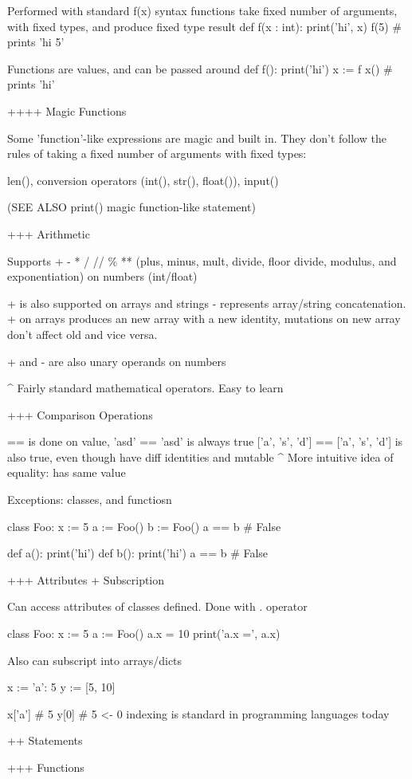 Performed with standard f(x) syntax
functions take fixed number of arguments, with fixed types, and produce fixed type result
def f(x : int): print('hi', x)
f(5) # prints 'hi 5'

Functions are values, and can be passed around
def f(): print('hi')
x := f
x() # prints 'hi'

++++ Magic Functions

Some 'function'-like expressions are magic and built in. They don't follow
the rules of taking a fixed number of arguments with fixed types:

len(), conversion operators (int(), str(), float()), input()

(SEE ALSO print() magic function-like statement)

+++ Arithmetic

Supports + - * / // \% ** (plus, minus, mult, divide, floor divide, modulus, and exponentiation)
on numbers (int/float)

+ is also supported on arrays and strings - represents array/string concatenation.
+ on arrays produces an new array with a new identity, mutations on new array don't affect old and vice versa.

+ and - are also unary operands on numbers

^ Fairly standard mathematical operators. Easy to learn

+++ Comparison Operations

== is done on value, 'asd' == 'asd' is always true
['a', 's', 'd'] == ['a', 's', 'd'] is also true, even though have diff identities and mutable
^ More intuitive idea of equality: has same value

Exceptions: classes, and functiosn

class Foo:
    x := 5
a := Foo()
b := Foo()
a == b # False

def a(): print('hi')
def b(): print('hi')
a == b # False

+++ Attributes + Subscription

Can access attributes of classes defined. Done with . operator

class Foo:
    x := 5
a := Foo()
a.x = 10
print('a.x =', a.x)

Also can subscript into arrays/dicts

x := {'a': 5}
y := [5, 10]

x['a'] # 5
y[0] # 5 <- 0 indexing is standard in programming languages today

++ Statements

+++ Functions

